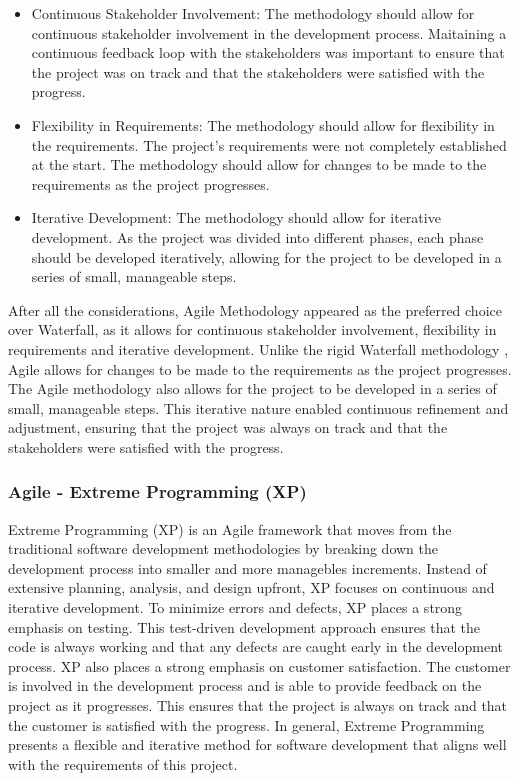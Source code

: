 \begin{itemize}
    \item Continuous Stakeholder Involvement: The methodology should allow for continuous stakeholder involvement in the development process. Maitaining a continuous feedback loop with the stakeholders was important to ensure that the project was on track and that the stakeholders were satisfied with the progress.
    \item Flexibility in Requirements: The methodology should allow for flexibility in the requirements. The project's requirements were not completely established at the start. The methodology should allow for changes to be made to the requirements as the project progresses.
    \item Iterative Development: The methodology should allow for iterative development. As the project was divided into different phases, each phase should be developed iteratively, allowing for the project to be developed in a series of small, manageable steps.    
\end{itemize}

After all the considerations, Agile Methodology \cite{despa2014comparative} appeared as the preferred choice over Waterfall, as it allows for continuous stakeholder involvement, flexibility in requirements and iterative development.
Unlike the rigid Waterfall methodology \cite{despa2014comparative}, Agile allows for changes to be made to the requirements as the project progresses. The Agile methodology also allows for the project to be developed in a series of small, manageable steps.
This iterative nature enabled continuous refinement and adjustment, ensuring that the project was always on track and that the stakeholders were satisfied with the progress.

\subsubsection*{Agile - Extreme Programming (XP)}
Extreme Programming (XP) is an Agile framework that moves from the traditional software development methodologies by breaking down the development process into smaller and more managebles increments.
Instead of extensive planning, analysis, and design upfront, XP focuses on continuous and iterative development. To minimize errors and defects, XP places a strong emphasis on testing.
This test-driven development approach ensures that the code is always working and that any defects are caught early in the development process.
XP also places a strong emphasis on customer satisfaction. The customer is involved in the development process and is able to provide feedback on the project as it progresses. This ensures that the project is always on track and that the customer 
is satisfied with the progress. \cite{despa2014comparative} 
In general, Extreme Programming presents a flexible and iterative method for software development that aligns well with the requirements of this project.

